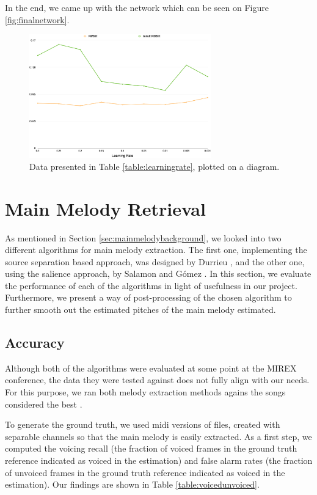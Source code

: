 In the end, we came up with the network which can be seen on Figure \ref{fig:finalnetwork}.

\begin{figure}[h]
	\centering
   \includegraphics[width=0.7\textwidth]{Figures/learningrate}
\caption{Data presented in Table \ref{table:learningrate}, plotted on a diagram.}
\end{figure}

\vspace{20pt}

\section{Main Melody Retrieval}

As mentioned in Section \ref{sec:mainmelodybackground}, we looked into two different algorithms for main melody extraction. The first one, implementing the source separation based approach, was designed by Durrieu \cite{durrieu}, and the other one, using the salience approach, by Salamon and G\'{o}mez \cite{salamon}. In this section, we evaluate the performance of each of the algorithms in light of usefulness in our project. Furthermore, we present a way of post-processing of the chosen algorithm to further smooth out the estimated pitches of the main melody estimated.

\subsection{Accuracy}

Although both of the algorithms were evaluated at some point at the MIREX conference, the data they were tested against does not fully align with our needs. For this purpose, we ran both melody extraction methods agains the songs considered the best \cite{toplists}.

To generate the ground truth, we used midi versions of files, created with separable channels so that the main melody is easily extracted. As a first step, we computed the voicing recall (the fraction of voiced frames in the ground truth reference indicated as voiced in the estimation) and false alarm rates (the fraction of unvoiced frames in the ground truth reference indicated as voiced in the estimation).
Our findings are shown in Table \ref{table:voicedunvoiced}.

